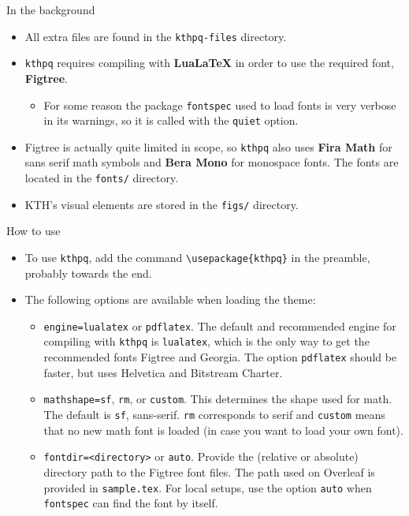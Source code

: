 \documentclass[17pt, t, lualatex]{beamer}
\renewcommand*{\emph}[1]{{\color{digital blue} \bfseries #1}}
\def\kthpq{\texttt{kthpq}}
\begin{document}
\begin{frame}{In the background}
\begin{itemize}
\item All extra files are found in the \texttt{kthpq-files} directory.
\item \kthpq{} requires compiling with \emph{LuaLaTeX} in order to use the required font, \emph{Figtree}.
\begin{itemize}
\item For some reason the package \texttt{fontspec} used to load fonts is very verbose in its warnings, so it is called with the \texttt{quiet} option.
\end{itemize}
\item Figtree is actually quite limited in scope, so \kthpq{} also uses \emph{Fira Math} for sans serif math symbols and \emph{Bera Mono} for monospace fonts. The fonts are located in the \texttt{fonts/} directory.
\item KTH's visual elements are stored in the \texttt{figs/} directory.
\end{itemize}
\end{frame}

\begin{frame}[fragile=singleslide]{How to use}
\begin{itemize}
\item To use \kthpq{}, add the command \verb|\usepackage{kthpq}| in the preamble, probably towards the end.
\item The following options are available when loading the theme:
\begin{itemize}
\item \texttt{engine=lualatex} or \texttt{pdflatex}. The default and recommended engine for compiling with \kthpq{} is \texttt{lualatex}, which is the only way to get the recommended fonts Figtree and Georgia. The option \texttt{pdflatex} should be faster, but uses Helvetica and Bitstream Charter.
\item \texttt{mathshape=sf}, \texttt{rm}, or \texttt{custom}. This determines the shape used for math. The default is \texttt{sf}, sans-serif. \texttt{rm} corresponds to serif and \texttt{custom} means that no new math font is loaded (in case you want to load your own font).
\item \texttt{fontdir=\textless directory\textgreater} or \texttt{auto}. Provide the (relative or absolute) directory path to the Figtree font files. The path used on Overleaf is provided in \texttt{sample.tex}. For local setups, use the option \texttt{auto} when \texttt{fontspec} can find the font by itself.
\end{itemize}
\end{itemize}
\end{frame}
\end{document}
